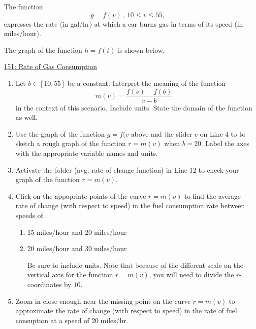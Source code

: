 \documentclass{ximera}
\begin{document}
\begin{question}  \label{Q4gdfetdsfsdfhfg4tr4}
The function
\[
      g = f(v)  \, , \, 10\leq v \leq 55 ,                     %
\]
expresses the rate (in gal/hr) at which a car burns gas in terms of its speed (in miles/hour).

The graph of the function $h=f(t)$ is shown below.

\begin{onlineOnly}
    \begin{center}
\end{center}
\end{onlineOnly}

\href{https://www.desmos.com/calculator/ye5yzglr36}{151: Rate of Gas Consumption}

\begin{enumerate}

\item Let $b\in [10,55]$ be a constant. Interpret the meaning of the function
\[
   m(v) =  \frac{f(v)-f(b)}{v-b}
\]
in the context of this scenario. Include units. State the domain of the function as well.

\item Use the graph of the function $g=f(v$ above and the slider $v$ on Line 4 to to sketch a rough graph of the function $r=m(v)$ when $b=20$. Label the axes with the appropriate variable names and units.

\item Activate the folder (avg. rate of change function) in Line 12 to check your graph of the function $r=m(v)$. 

\item Click on the appopriate points of the curve $r=m(v)$ to find the average rate of change (with respect to speed) in the fuel consumption rate between speeds of  

\begin{enumerate}
\item 15 miles/hour and 20 miles/hour

\item 20 miles/hour and 30 miles/hour

Be sure to include units. Note that because of the different  scale on the vertical axis for the function $r=m(v)$, you will need to divide the $r$-coordinates by $10$.

\end{enumerate}

\item Zoom in close enough near the missing point on the curve $r=m(v)$ to approximate the rate of change (with respect to speed) in the rate of fuel consuption at a speed of $20$ miles/hr.


\end{enumerate}
\end{question}
\end{document}
